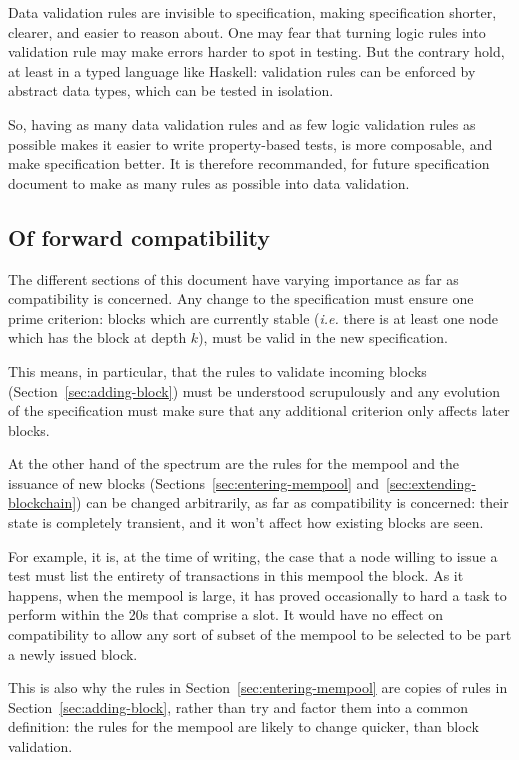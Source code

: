 \documentclass{article}
\begin{document}
Data validation rules are invisible to specification, making
specification shorter, clearer, and easier to reason about. One may
fear that turning logic rules into validation rule may make errors
harder to spot in testing. But the contrary hold, at least in a typed
language like Haskell: validation rules can be enforced by abstract
data types, which can be tested in isolation.

So, having as many data validation rules and as few logic validation
rules as possible makes it easier to write property-based tests, is
more composable, and make specification better. It is therefore
recommanded, for future specification document to make as many rules
as possible into data validation.

\subsection{Of forward compatibility}
\label{sec:forward-comp}

The different sections of this document have varying importance as far
as compatibility is concerned. Any change to the specification must
ensure one prime criterion: blocks which are currently stable
(\emph{i.e.} there is at least one node which has the block at depth
$k$), must be valid in the new specification.

This means, in particular, that the rules to validate incoming blocks
(Section~\ref{sec:adding-block}) must be understood scrupulously and
any evolution of the specification must make sure that any additional
criterion only affects later blocks.

At the other hand of the spectrum are the rules for the mempool and
the issuance of new blocks (Sections~\ref{sec:entering-mempool}
and~\ref{sec:extending-blockchain}) can be changed arbitrarily, as far
as compatibility is concerned: their state is completely transient,
and it won't affect how existing blocks are seen.

For example, it is, at the time of writing, the case that a node
willing to issue a test must list the entirety of transactions in this
mempool the block. As it happens, when the mempool is large, it has
proved occasionally to hard a task to perform within the 20s that
comprise a slot. It would have no effect on compatibility to allow any
sort of subset of the mempool to be selected to be part a newly issued
block.

This is also why the rules in Section~\ref{sec:entering-mempool} are
copies of rules in Section~\ref{sec:adding-block}, rather than try and
factor them into a common definition: the rules for the mempool are
likely to change quicker, than block validation.
\end{document}
